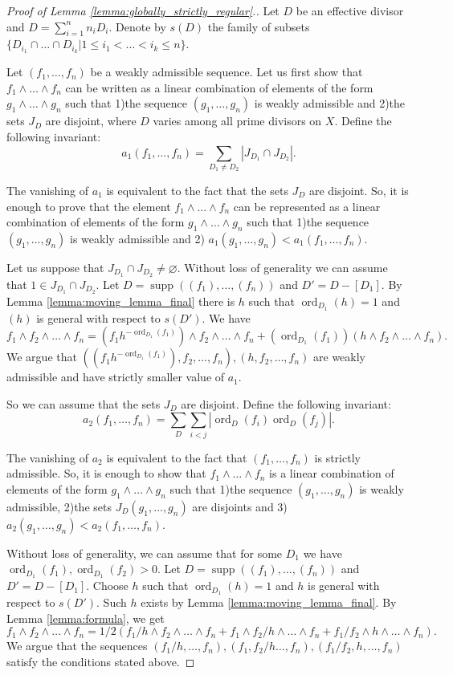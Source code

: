 \documentclass[12pt]{extarticle}
\def\wdw{\wedge\dots\wedge}
\DeclareMathOperator{\ord}{ord}
\DeclareMathOperator{\supp}{supp}
\begin{document}
\begin{proof}[Proof of Lemma \ref{lemma:globally_strictly_regular}.]
    Let $D$ be an effective divisor and $D=\sum\limits_{i=1}^nn_iD_i$. Denote by $s(D)$ the family of subsets $\{D_{i_1}\cap\dots\cap D_{i_k}| 1\leq i_1<\dots< i_k\leq n\}$.
    
    Let $(f_1,\dots,f_n)$ be a weakly admissible sequence. Let us first show that $f_1\wdw f_n$ can be written as a linear combination of elements of the form $g_1\wdw g_n$ such that 1)the sequence $(g_1,\dots, g_n)$ is weakly admissible and 2)the sets $J_D$ are disjoint, where $D$ varies among all prime divisors on $X$. Define the following invariant:    
$$a_1(f_1,\dots, f_n)=\sum\limits_{D_1\ne D_2}|J_{D_1}\cap J_{D_2}|.$$ 

The vanishing of $a_1$ is equivalent to the fact that the sets $J_D$ are disjoint. So, it is enough to prove that the element $f_1\wdw f_n$ can be represented as a linear combination of elements of the form $g_1\wdw g_n$ such that 1)the sequence $(g_1,\dots, g_n)$ is weakly admissible and 2) $a_1(g_1,\dots, g_n)<a_1(f_1, \dots, f_n)$.

Let us suppose that $J_{D_1}\cap J_{D_2}\ne\varnothing.$ Without loss of generality we can assume that $1\in J_{D_1}\cap J_{D_2}$. Let $D=\supp((f_1),\dots, (f_n))$ and $D'=D-[D_1]$. By Lemma \ref{lemma:moving_lemma_final} there is $h$ such that $\ord_{D_1}(h)=1$ and $(h)$ is general with respect to $s(D')$. We have
    $$f_1\wedge f_2\wdw f_n=(f_1h^{-\ord_{D_1}(f_1)})\wedge f_2\wdw f_n+(\ord_{D_1}(f_1))(h\wedge f_2\wdw f_n).$$
    We argue that $((f_1h^{-\ord_{D_1}(f_{1})}),f_2,\dots, f_n), (h,f_2,\dots, f_n)$ are weakly admissible and have strictly smaller value of $a_1$.

    So we can assume that the sets $J_D$ are disjoint. Define the following invariant:
    $$a_2(f_1,\dots, f_n)=\sum\limits_{D}\sum\limits_{i<j}|\ord_D(f_i)\ord_D(f_j)|.$$ 
    
    The vanishing of $a_2$ is equivalent to the fact that $(f_1,\dots, f_n)$ is strictly admissible. So, it is enough to show that $f_1\wdw f_n$ is a linear combination of elements of the form $g_1\wdw g_n$ such that 1)the sequence $(g_1,\dots, g_n)$ is weakly admissible, 2)the sets $J_D(g_1,\dots, g_n)$ are disjoints and 3)$a_2(g_1,\dots, g_n)<a_2(f_1,\dots, f_n)$. 
    
    Without loss of generality, we can assume that for some $D_1$ we have $\ord_{D_1}(f_1), \ord_{D_1}(f_2)>0$. Let $D=\supp((f_1),\dots, (f_n))$ and $D'=D-[D_1]$. Choose $h$ such that $\ord_{D_1}(h)=1$ and $h$ is general with respect to $s(D')$. Such $h$ exists by Lemma \ref{lemma:moving_lemma_final}.  By Lemma \ref{lemma:formula}, we get
    $$f_1\wedge f_2\wdw f_n=1/2(f_1/h\wedge f_2\wdw f_n+f_1\wedge f_2/h\wdw f_n+f_1/f_2\wedge h\wdw f_n).$$
    We argue that the sequences $(f_1/h,\dots, f_n), (f_1,f_2/h\dots, f_n), (f_1/f_2,h,\dots, f_n)$ satisfy the conditions stated above.
\end{proof}
\end{document}

